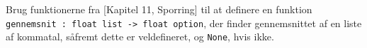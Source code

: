 Brug funktionerne fra [Kapitel 11, Sporring]  til at definere en funktion \lstinline{gennemsnit : float list -> float option}, der finder gennemsnittet af en liste af kommatal, såfremt dette er veldefineret, og \lstinline{None}, hvis ikke.
